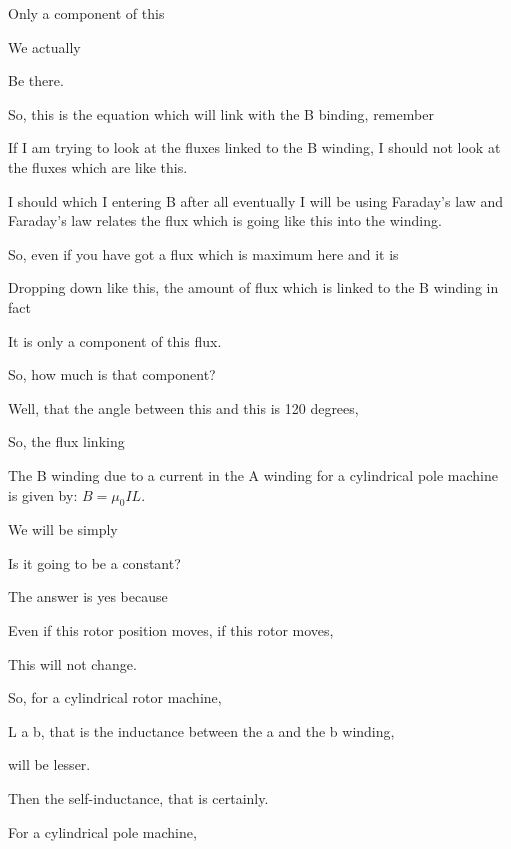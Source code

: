 \documentclass{article}
\begin{document}
Only a component of this

We actually

Be there.

So, this is the equation which will link with the B binding, remember

If I am trying to look at the fluxes linked to the B winding, I should not look at the fluxes which are like this.

I should which I entering B after all eventually I will be using Faraday's law and Faraday's law relates the flux which is going like this into the winding.

So, even if you have got a flux which is maximum here and it is

Dropping down like this, the amount of flux which is linked to the B winding in fact

It is only a component of this flux.

So, how much is that component?

Well, that the angle between this and this is 120 degrees,



So, the flux linking

The B winding due to a current in the A winding for a cylindrical pole machine is given by: $B = \mu_0 I L$.

We will be simply

Is it going to be a constant?

The answer is yes because

Even if this rotor position moves, if this rotor moves,

This will not change.

So, for a cylindrical rotor machine,





L a b, that is the inductance between the a and the b winding,

will be lesser.

Then the self-inductance, that is certainly.

For a cylindrical pole machine,
\end{document}
